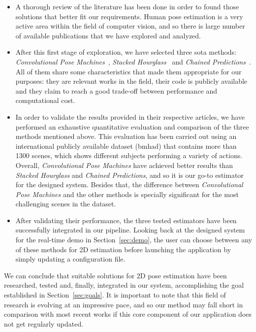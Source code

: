 \begin{itemize}
    \item A thorough review of the literature has been done in order to found those solutions that better fit our requirements. Human pose estimation is a very active area within the field of computer vision, and so there is large number of available publications that we have explored and analyzed.
    \item After this first stage of exploration, we have selected three \gls{sota} methods: \emph{Convolutional Pose Machines}~\cite{Wei2016-rb}, \emph{Stacked Hourglass}~\cite{Newell2016-cy} and \emph{Chained Predictions}~\cite{Gkioxari2016-ix}. All of them share some characteristics that made them appropriate for our purposes: they are relevant works in the field, their code is publicly available and they claim to reach a good trade-off between performance and computational cost.
    \item In order to validate the results provided in their respective articles, we have performed an exhaustive quantitative evaluation and comparison of the three methods mentioned above. This evaluation has been carried out using an international publicly available dataset (\gls{bmhad}) that contains more than 1300 scenes, which shows different subjects performing a variety of actions. Overall, \emph{Convolutional Pose Machines} have achieved better results than \emph{Stacked Hourglass} and \emph{Chained Predictions}, and so it is our go-to estimator for the designed system. Besides that, the difference between \emph{Convolutional Pose Machines} and the other methods is specially significant for the most challenging scenes in the dataset.
    \item After validating their performance, the three tested estimators have been successfully integrated in our pipeline. Looking back at the designed system for the real-time demo in Section~\ref{sec:demo}, the user can choose between any of these methods for 2D estimation before launching the application by simply updating a configuration file.
\end{itemize}

We can conclude that suitable solutions for 2D pose estimation have been researched, tested and, finally, integrated in our system, accomplishing the goal established in Section~\ref{sec:goals}. It is important to note that this field of research is evolving at an impressive pace, and so our method may fall short in comparison with most recent works if this core component of our application does not get regularly updated. 

